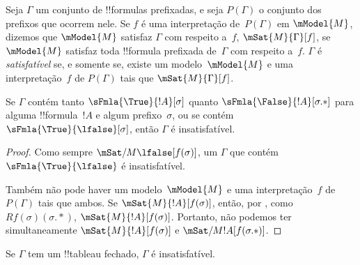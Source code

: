 \documentclass[../../../include/open-logic-section]{subfiles}
\begin{document}
\begin{defn}
  Seja $\Gamma$ um conjunto de !!{formula}s prefixadas, e seja $P(\Gamma)$
  o conjunto dos prefixos que ocorrem nele. Se $f$ é uma interpretação
  de~$P(\Gamma)$ em $\mModel{M}$, dizemos que $\mModel{M}$ satisfaz
  $\Gamma$ com respeito a~$f$, $\mSat{M}{\Gamma}[f]$, se $\mModel{M}$
  satisfaz toda !!{formula} prefixada de~$\Gamma$ com respeito
  a~$f$. $\Gamma$ é \emph{satisfatível} se, e somente se, existe um
  modelo~$\mModel{M}$ e uma interpretação~$f$ de $P(\Gamma)$ tais que
  $\mSat{M}{\Gamma}[f]$.
\end{defn}

\begin{prop}
  Se $\Gamma$ contém tanto $\sFmla{\True}{!A}[\sigma]$ quanto
  $\sFmla{\False}{!A}[\sigma.{*}]$ para alguma !!{formula}~$!A$ e algum
  prefixo~$\sigma$, ou se contém $\sFmla{\True}{\lfalse}[\sigma]$, então $\Gamma$ é insatisfatível.
\end{prop}

\begin{proof}
  Como sempre $\mSat/{M}{\lfalse}[f(\sigma)]$, um $\Gamma$ que
  contém $\sFmla{\True}{\lfalse}$ é insatisfatível.

  Também não pode haver um modelo~$\mModel{M}$ e uma interpretação~$f$ de
  $P(\Gamma)$ tais que ambos. Se $\mSat{M}{!A}[f(\sigma)]$, então, por
  , como
  $Rf(\sigma)(\sigma.{*})$, $\mSat{M}{!A}[f(\sigma)]$. Portanto, não podemos
  ter simultaneamente $\mSat{M}{!A}[f(\sigma)]$ e
  $\mSat/{M}{!A}[f(\sigma.{*})]$.
\end{proof}

\begin{thm}[Correção]
  Se $\Gamma$ tem um !!{tableau} fechado, $\Gamma$ é insatisfatível.
\end{thm}
\end{document}
